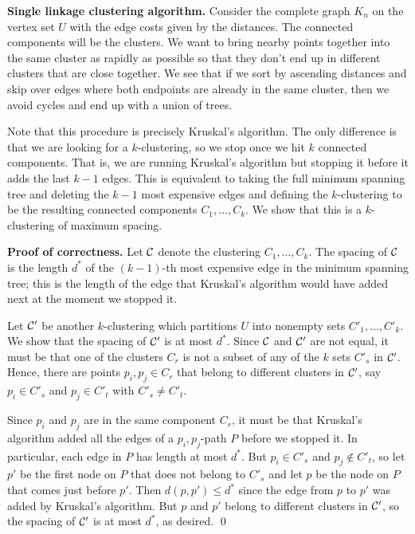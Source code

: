 \documentclass{article}
\begin{document}
{\color{violet}
{\bf Single linkage clustering algorithm.} Consider the complete
graph $K_n$ on the vertex set $U$ with the edge costs given by 
the distances. The connected components will be the clusters. 
We want to bring nearby points together into the 
same cluster as rapidly as possible so that they don't end up 
in different clusters that are close together. We see that 
if we sort by ascending distances and skip over edges where 
both endpoints are already in the same cluster, then we avoid 
cycles and end up with a union of trees. 

Note that this procedure is precisely Kruskal's algorithm. The only difference 
is that we are looking for a $k$-clustering, so we stop once we hit $k$ 
connected components. That is, we 
are running Kruskal's algorithm but stopping it before it 
adds the last $k-1$ edges. This is equivalent to taking the 
full minimum spanning tree and deleting the $k-1$ most expensive edges 
and defining the $k$-clustering to be the resulting connected 
components $C_1, \dots, C_k$. We show that this is a 
$k$-clustering of maximum spacing.}

{\color{blue}
{\bf Proof of correctness.} Let ${\cal C}$ denote the clustering 
$C_1, \dots, C_k$. The spacing of ${\cal C}$ is the length 
$d^*$ of the $(k-1)$-th most expensive edge in the minimum spanning tree; 
this is the length of the edge that Kruskal's algorithm would have added 
next at the moment we stopped it. 

Let ${\cal C}'$ be another $k$-clustering which partitions $U$ 
into nonempty sets $C'_1, \dots, C'_k$. We show that the spacing of ${\cal C}'$ 
is at most $d^*$.
Since ${\cal C}$ and ${\cal C}'$ are not equal, it must be that one of 
the clusters $C_r$ is not a subset of any of the $k$ sets $C'_s$ in ${\cal C}'$. 
Hence, there are points $p_i, p_j \in C_r$ that belong to different 
clusters in ${\cal C}'$, say $p_i \in C'_s$ and $p_j \in C'_t$ with 
$C'_s \neq C'_t$. 

Since $p_i$ and $p_j$ are in the same component $C_r$, it must be that 
Kruskal's algorithm added all the edges of a $p_i, p_j$-path $P$ 
before we stopped it. In particular, each edge in $P$ has length at most $d^*$. 
But $p_i \in C'_s$ and $p_j \notin C'_t$, so let $p'$ be the first 
node on $P$ that does not belong to $C'_s$ and let $p$ be the node on $P$
that comes just before $p'$. Then $d(p, p') \leq d^*$ since the edge 
from $p$ to $p'$ was added by Kruskal's algorithm. But $p$ and $p'$ 
belong to different clusters in ${\cal C}'$, so the spacing of ${\cal C}'$ 
is at most $d^*$, as desired. \qed 
}
\end{document}
